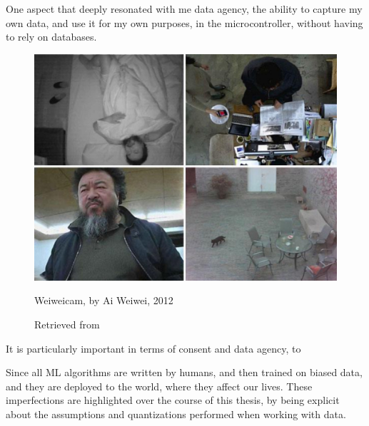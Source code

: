 One aspect that deeply resonated with me data agency, the ability to capture my own data, and use it for my own purposes, in the microcontroller, without having to rely on databases. 

\begin{figure}[ht]
  \centering
  \includegraphics[width=0.75\linewidth,height=0.25\textheight,keepaspectratio]{images/weiweicam.jpg}
  \caption{Weiweicam, by Ai Weiwei, 2012}
  \caption*{Retrieved from \cite{website-forbes-ai-weiwei-cam}}
  \label{fig:weiweicam}
\end{figure}


It is particularly important in terms of consent and data agency, to 

Since all \acrshort{ML} algorithms are written by humans, and then trained on biased data, and they are deployed to the world, where they affect our lives. These imperfections are highlighted over the course of this thesis, by being explicit about the assumptions and quantizations performed when working with data.

